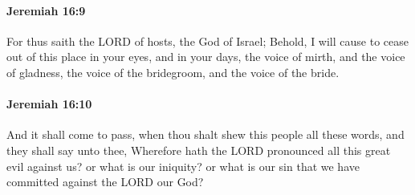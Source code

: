		\paragraph{Jeremiah 16:9} %
			\label{JEREMIAH-16-9}

			For thus saith the LORD of hosts, the God of Israel; Behold, I will cause to cease out of this place in your eyes, and in your days, the voice of mirth, and the voice of gladness, the voice of the bridegroom, and the voice of the bride.


		\paragraph{Jeremiah 16:10} %
			\label{JEREMIAH-16-10}

			And it shall come to pass, when thou shalt shew this people all these words, and they shall say unto thee, Wherefore hath the LORD pronounced all this great evil against us? or what is our iniquity? or what is our sin that we have committed against the LORD our God?

